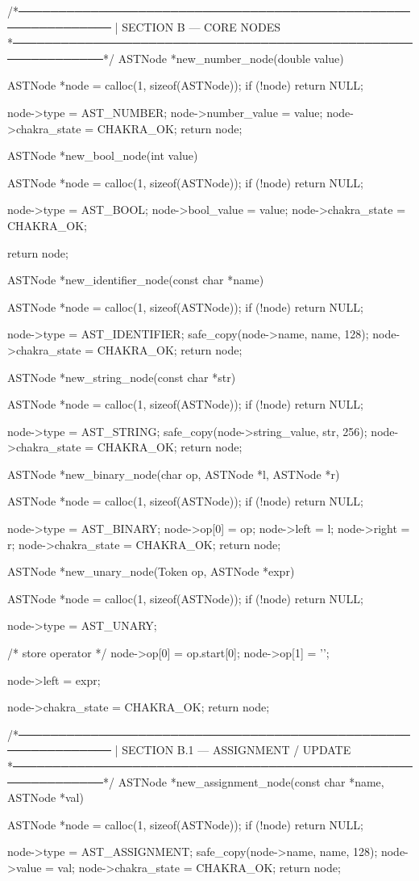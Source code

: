 \documentclass{article}
\begin{document}
/*──────────────────────────────────────────────────────────────
 | SECTION B — CORE NODES
 *──────────────────────────────────────────────────────────────*/
ASTNode *new_number_node(double value)
{
    ASTNode *node = calloc(1, sizeof(ASTNode));
    if (!node) return NULL;

    node->type = AST_NUMBER;
    node->number_value = value;
    node->chakra_state = CHAKRA_OK;
    return node;
}

ASTNode *new_bool_node(int value)
{
    ASTNode *node = calloc(1, sizeof(ASTNode));
    if (!node) return NULL;

    node->type = AST_BOOL;
    node->bool_value = value;
    node->chakra_state = CHAKRA_OK;

    return node;
}

ASTNode *new_identifier_node(const char *name)
{
    ASTNode *node = calloc(1, sizeof(ASTNode));
    if (!node) return NULL;

    node->type = AST_IDENTIFIER;
    safe_copy(node->name, name, 128);
    node->chakra_state = CHAKRA_OK;
    return node;
}

ASTNode *new_string_node(const char *str)
{
    ASTNode *node = calloc(1, sizeof(ASTNode));
    if (!node) return NULL;

    node->type = AST_STRING;
    safe_copy(node->string_value, str, 256);
    node->chakra_state = CHAKRA_OK;
    return node;
}

ASTNode *new_binary_node(char op, ASTNode *l, ASTNode *r)
{
    ASTNode *node = calloc(1, sizeof(ASTNode));
    if (!node) return NULL;

    node->type = AST_BINARY;
    node->op[0] = op;
    node->left = l;
    node->right = r;
    node->chakra_state = CHAKRA_OK;
    return node;
}

ASTNode *new_unary_node(Token op, ASTNode *expr)
{
    ASTNode *node = calloc(1, sizeof(ASTNode));
    if (!node) return NULL;

    node->type = AST_UNARY;

    /* store operator */
    node->op[0] = op.start[0];
    node->op[1] = '\0';

    node->left = expr;

    node->chakra_state = CHAKRA_OK;
    return node;
}
/*──────────────────────────────────────────────────────────────
 | SECTION B.1 — ASSIGNMENT / UPDATE
 *──────────────────────────────────────────────────────────────*/
ASTNode *new_assignment_node(const char *name, ASTNode *val)
{
    ASTNode *node = calloc(1, sizeof(ASTNode));
    if (!node) return NULL;

    node->type = AST_ASSIGNMENT;
    safe_copy(node->name, name, 128);
    node->value = val;
    node->chakra_state = CHAKRA_OK;
    return node;
}
\end{document}
